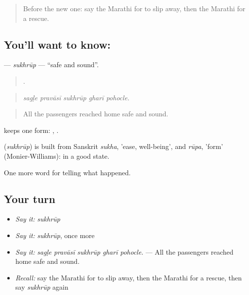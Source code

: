 \label{lesson:MR-C291-sukhrup}



\begin{quote}
Before the new one: say the Marathi for to slip away, then the Marathi for a rescue.
\end{quote}

\subsection*{You'll want to know: }
\textbf{} — \emph{sukhrūp} — \textquotedblleft{}safe and sound\textquotedblright{}.

\begin{quote}
    .
\end{quote}

\begin{quote}
\emph{sagḷe pravāsī sukhrūp gharī pohocle.}
\end{quote}

\begin{quote}
All the passengers reached home safe and sound.
\end{quote}

 keeps one form:   ,   .

\begin{cousinweb}
\textbf{} (\emph{sukhrūp}) is built from Sanskrit \emph{sukha}, 'ease, well-being', and \emph{rūpa}, 'form' (Monier-Williams): in a good state.
\end{cousinweb}

\begin{grammarlens}[title={What you've built}]
One more word for telling what happened.
\end{grammarlens}

\subsection*{Your turn}
\begin{itemize}
\raggedright
  \item \emph{Say it:} \emph{sukhrūp}
  \item \emph{Say it:} \emph{sukhrūp}, once more
  \item \emph{Say it:} \emph{sagḷe pravāsī sukhrūp gharī pohocle.} — All the passengers reached home safe and sound.
  \item \emph{Recall:} say the Marathi for to slip away, then the Marathi for a rescue, then say \emph{sukhrūp} again
\end{itemize}

